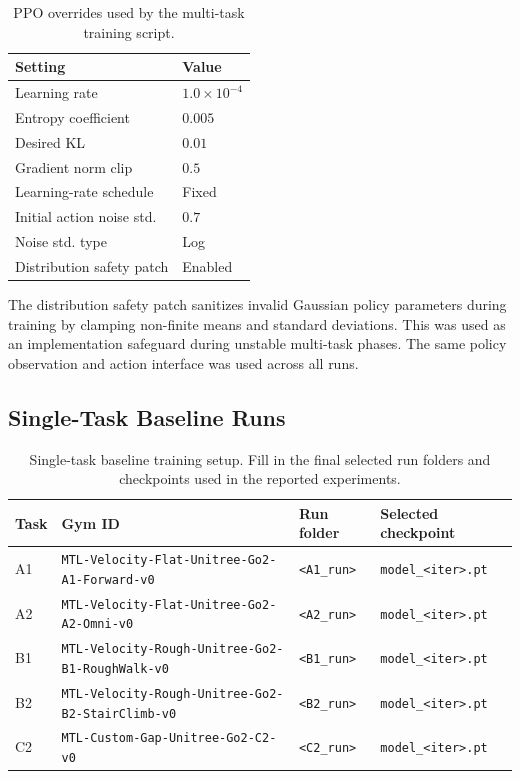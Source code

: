 \begin{table}[htbp]
\centering
\caption{PPO overrides used by the multi-task training script.}
\label{tab:ppo-settings}
\begin{tabular}{ll}
\toprule
Setting & Value \\
\midrule
Learning rate & $1.0 \times 10^{-4}$ \\
Entropy coefficient & $0.005$ \\
Desired KL & $0.01$ \\
Gradient norm clip & $0.5$ \\
Learning-rate schedule & Fixed \\
Initial action noise std. & $0.7$ \\
Noise std. type & Log \\
Distribution safety patch & Enabled \\
\bottomrule
\end{tabular}
\end{table}

The distribution safety patch sanitizes invalid Gaussian policy parameters during training by clamping non-finite means and standard deviations. This was used as an implementation safeguard during unstable multi-task phases. The same policy observation and action interface was used across all runs.

\subsection{Single-Task Baseline Runs}
\label{app:single-task-runs}

\begin{table}[htbp]
\centering
\caption{Single-task baseline training setup. Fill in the final selected run folders and checkpoints used in the reported experiments.}
\label{tab:single-task-runs}
\begin{tabular}{llll}
\toprule
Task & Gym ID & Run folder & Selected checkpoint \\
\midrule
A1 & \texttt{MTL-Velocity-Flat-Unitree-Go2-A1-Forward-v0} & \texttt{<A1\_run>} & \texttt{model\_<iter>.pt} \\
A2 & \texttt{MTL-Velocity-Flat-Unitree-Go2-A2-Omni-v0} & \texttt{<A2\_run>} & \texttt{model\_<iter>.pt} \\
B1 & \texttt{MTL-Velocity-Rough-Unitree-Go2-B1-RoughWalk-v0} & \texttt{<B1\_run>} & \texttt{model\_<iter>.pt} \\
B2 & \texttt{MTL-Velocity-Rough-Unitree-Go2-B2-StairClimb-v0} & \texttt{<B2\_run>} & \texttt{model\_<iter>.pt} \\
C2 & \texttt{MTL-Custom-Gap-Unitree-Go2-C2-v0} & \texttt{<C2\_run>} & \texttt{model\_<iter>.pt} \\
\bottomrule
\end{tabular}
\end{table}

